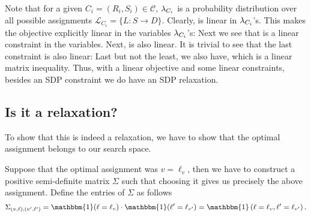 Note that for a given $C_i =(R_i, S_i) \in \mathcal{C}$, $\lambda_{C_i}$ is a probability distribution over all possible assignments $\mathcal{L}_{C_i} = \{L: S \rightarrow D\}$. Clearly,  
is linear in $\lambda_{C_i}$'s.
This makes the objective explicitly linear in the variables $\lambda_{C_i}$'s:
Next we see that 
is a linear constraint in the variables. Next, 
is also linear. 
It is trivial to see that the last constraint is also linear:
Last but not the least, we also have, 
which is a linear matrix inequality. Thus, with a linear objective and some linear constraints, besides an SDP constraint we do have an SDP relaxation.

\subsection{Is it a relaxation?}
To show that this is indeed a relaxation, we have to show that the optimal assignment belongs to our search space. 

Suppose that the optimal assignment was $v=\ell_v$, then we have to construct a positive semi-definite matrix $\Sigma$ such that choosing it gives us precisely the above assignment. 
Define the entries of $\Sigma$ as follows 
$$ \Sigma_{\lrb{v, \ell},\lrb{v', \ell'}} = \mathbbm{1}(\ell = \ell_v) \cdot \mathbbm{1}(\ell' = \ell_{v'}) = \mathbbm{1}\lrb{\ell = \ell_v, \ell'= \ell_{v'}}.$$ 

